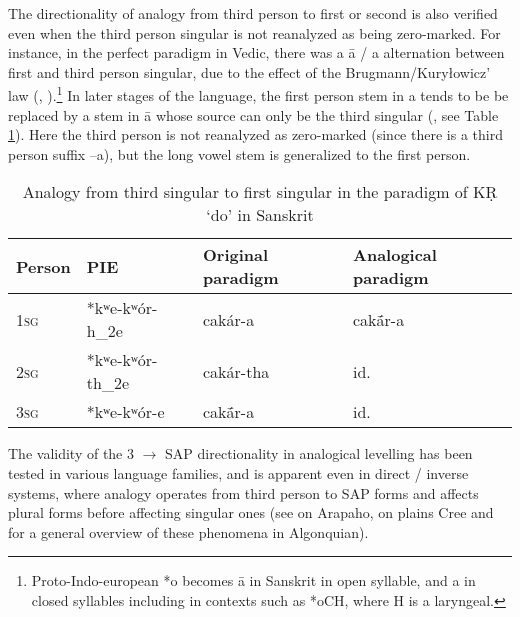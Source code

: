 \documentclass[oneside,a4paper,11pt]{article}
\newcommand{\ipa}[1]{{\phon#1}} %
\begin{document}
The directionality of analogy from third person to first or second is also verified even when the third person singular is not reanalyzed as being zero-marked. For instance, in the perfect paradigm in Vedic, there was a  \ipa{ā} / \ipa{a} alternation between first and third person singular, due to the effect of the Brugmann/Kuryłowicz' law (\citealt{kurylowicz27indoiranien}, \citealt[205]{fortson10intro}).\footnote{Proto-Indo-european *\ipa{o} becomes \ipa{ā} in Sanskrit in open syllable, and \ipa{a} in closed syllables including in contexts such as *\ipa{oCH}, where H is a laryngeal.} In later stages of the language, the first person stem in \ipa{a} tends to be be replaced by a stem in \ipa{ā} whose source can only be the third singular (\citealt[283-9]{whitney24}, see Table \ref{tab:skt}). Here the third person is not reanalyzed as zero-marked (since there is a third person suffix \ipa{--a}), but the long vowel stem is generalized to the first person.

\begin{table}
\caption{Analogy from third singular to first singular in the paradigm of \ipa{KṚ} `do' in Sanskrit} \label{tab:skt} \centering
\begin{tabular}{llll}
\toprule
Person & PIE & Original paradigm & Analogical paradigm \\
\midrule
\textsc{1sg} & *\ipa{kʷe-kʷór-h_2e} & \ipa{cakár-a} & \ipa{cakā́r-a} \\
\textsc{2sg} & *\ipa{kʷe-kʷór-th_2e} & \ipa{cakár-tha} & id. \\
\textsc{3sg} & *\ipa{kʷe-kʷór-e} & \ipa{cakā́r-a} & id. \\
\bottomrule
\end{tabular}
\end{table}

 The validity of the 3 $\rightarrow$ SAP directionality in analogical levelling has been tested in various language families, and is apparent even in direct / inverse systems, where analogy operates from third person to SAP forms and affects plural forms before affecting singular ones (see \citealt{goddard65arapaho} on Arapaho, \citealt{dahlstrom89change} on plains Cree and \citealt{jacques15directionality} for a general overview of these phenomena in Algonquian).
   
\end{document}
